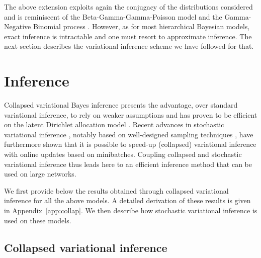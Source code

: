 The above extension exploits again the conjugacy of the distributions considered and is reminiscent of the Beta-Gamma-Gamma-Poisson model \cite{zhou2012beta} and the Gamma-Negative Binomial process \cite{zhou2015negative}. However, as for most hierarchical Bayesian models, exact inference is intractable and one must resort to approximate inference. The next section describes the variational inference scheme we have followed for that.

\section{Inference}
\label{sec:inference}

Collapsed variational Bayes inference presents the advantage, over standard variational inference, to rely on weaker assumptions and has proven to be efficient on the latent Dirichlet allocation model \cite{teh2007collapsed}. Recent advances in stochastic variational inference \cite{hoffman2013stochastic}, notably based on well-designed sampling techniques \cite{gopalan2013efficient,kim2013efficient}, have furthermore shown that it is possible to speed-up (collapsed) variational inference with online updates based on minibatches.
Coupling collapsed and stochastic variational inference thus leads here to an efficient inference method that can be used on large networks.

We first provide below the results obtained through collapsed variational inference for all the above models. A detailed derivation of these results is given in Appendix~\ref{app:collap}. We then describe how stochastic variational inference is used on these models.

\subsection{Collapsed variational inference}

